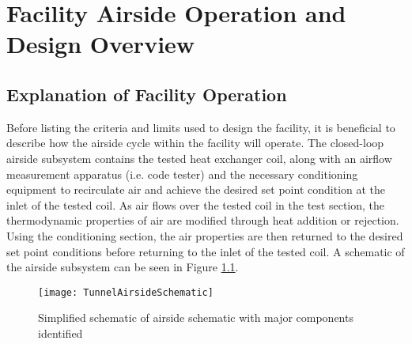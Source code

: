 \chapter{Facility Airside Operation and Design Overview}
\label{ch:Facility Airside Operation and Design Overview}

\section{Explanation of Facility Operation}
\label{sec:Explanation of Facility Operation}

Before listing the criteria and limits used to design the facility, it is beneficial to describe how the airside cycle within the facility will operate. The closed-loop airside subsystem contains the tested heat exchanger coil, along with an airflow measurement apparatus (i.e. code tester) and the necessary conditioning equipment to recirculate air and achieve the desired set point condition at the inlet of the tested coil. As air flows over the tested coil in the test section, the thermodynamic properties of air are modified through heat addition or rejection. Using the conditioning section, the air properties are then returned to the desired set point conditions before returning to the inlet of the tested coil. A schematic of the airside subsystem can be seen in Figure \ref{fig:TunnelAirsideSchematic}.

\begin{figure}[h!]
    \centering
    \texttt{[image: TunnelAirsideSchematic]}
    \caption{Simplified schematic of airside schematic with major components identified}
    \label{fig:TunnelAirsideSchematic}
\end{figure}

